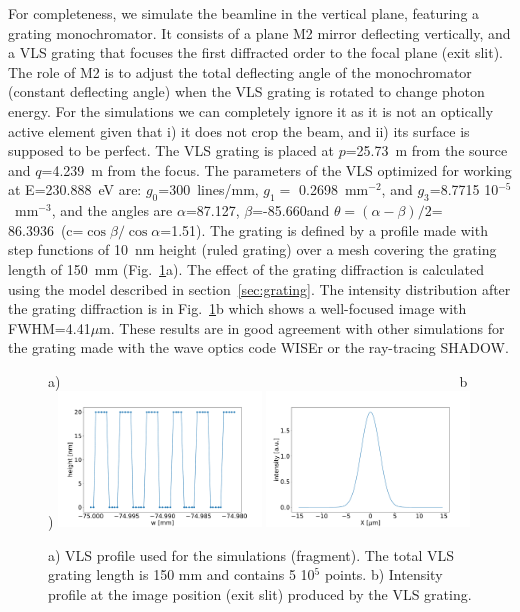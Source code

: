 \documentclass{iucr}
\begin{document}
For completeness, we simulate the beamline in the vertical plane, featuring a grating monochromator. It consists of a plane M2 mirror deflecting vertically, and a VLS grating that focuses the first diffracted order to the focal plane (exit slit). The role of M2 is to adjust the total deflecting angle of the monochromator (constant deflecting angle) when the VLS grating is rotated to change photon energy. For the simulations we can completely ignore it as it is not an optically active element given that i) it does not crop the beam, and ii) its surface is supposed to be perfect. The VLS grating is placed at $p$=25.73~m from the source and $q$=4.239~m from the focus. The parameters of the VLS optimized for working at E=230.888~eV are: $g_0$=300~lines/mm, $g_1=$ 0.2698~mm$^{-2}$, and $g_3$=8.7715 10${^{-5}}$~mm$^{-3}$, and the angles are $\alpha$=87.127\textdegree, $\beta$=-85.660\textdegree and $\theta=(\alpha-\beta)/2$= 86.3936\textdegree ~(c=$\cos \beta / \cos \alpha$=1.51). The grating is defined by a profile made with step functions of 10~nm height (ruled grating) over a mesh covering the grating length of 150~mm (Fig.~\ref{fig:grating}a). The effect of the grating diffraction is calculated using the model described in section~\ref{sec:grating}. The intensity distribution after the grating diffraction is in Fig.~\ref{fig:grating}b which shows a well-focused image with FWHM=4.41$\mu$m. These results are in good agreement with other simulations for the grating made with the wave optics code WISEr \cite{Raimondi2014} or the ray-tracing SHADOW.

  \begin{figure}
  \label{fig:grating} 
  \begin{flushleft}

  a)~~~~~~~~~~~~~~~~~~~~~~~~~~~~~~~~~~~~~~~~~~~~~~~~~~~~~~~~~b)
  \includegraphics[width=0.48\textwidth]{figures/grating.pdf} 
   \includegraphics[width=0.48\textwidth]{figures/intensitygrating.pdf}
  \end{flushleft}
  \caption{ a) VLS profile used for the simulations (fragment). The total VLS grating length is 150 mm and contains 5 10$^5$ points. b) Intensity profile at the image position (exit slit) produced by the VLS grating.}
  \end{figure}
\end{document}

